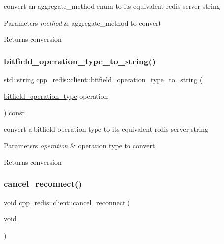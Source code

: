 convert an aggregate\+\_\+method enum to its equivalent redis-\/server string


\begin{DoxyParams}{Parameters}
{\em method} & aggregate\+\_\+method to convert \\
\hline
\end{DoxyParams}
\begin{DoxyReturn}{Returns}
conversion 
\end{DoxyReturn}
\mbox{\label{classcpp__redis_1_1client_a11a73f30d14e6d27f6c8c8cee53a3a04}} 
\subsubsection{\texorpdfstring{bitfield\+\_\+operation\+\_\+type\+\_\+to\+\_\+string()}{bitfield\_operation\_type\_to\_string()}}
{\footnotesize\ttfamily std\+::string cpp\+\_\+redis\+::client\+::bitfield\+\_\+operation\+\_\+type\+\_\+to\+\_\+string (\begin{DoxyParamCaption}\item[{\hyperlink{classcpp__redis_1_1client_a2e2023534299541da0a659802e2f087d}{bitfield\+\_\+operation\+\_\+type}}]{operation }\end{DoxyParamCaption}) const}

convert a bitfield operation type to its equivalent redis-\/server string


\begin{DoxyParams}{Parameters}
{\em operation} & operation type to convert \\
\hline
\end{DoxyParams}
\begin{DoxyReturn}{Returns}
conversion 
\end{DoxyReturn}
\mbox{\label{classcpp__redis_1_1client_adb605a877f65b8f54725576b45aeeca6}} 
\subsubsection{\texorpdfstring{cancel\+\_\+reconnect()}{cancel\_reconnect()}}
{\footnotesize\ttfamily void cpp\+\_\+redis\+::client\+::cancel\+\_\+reconnect (\begin{DoxyParamCaption}\item[{void}]{ }\end{DoxyParamCaption})}

